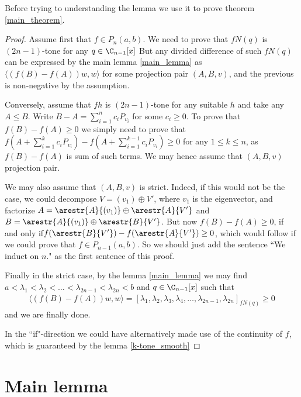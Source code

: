 Before trying to understanding the lemma we use it to prove theorem \ref{main_theorem}.

\begin{proof}
	Assume first that $f \in P_{n}(a, b)$. We need to prove that $f N(q)$ is $(2 n - 1)$-tone for any $q \in \C_{n - 1}[x]$ But any divided difference of such $f N(q)$ can be expressed by the main lemma \ref{main_lemma} as $\langle (f(B) - f(A)) w, w \rangle$ for some projection pair $(A, B, v)$, and the previous is non-negative by the assumption.

	Conversely, assume that $f h$ is $(2 n - 1)$-tone for any suitable $h$ and take any $A \leq B$. Write $B - A = \sum_{i = 1}^{n} c_{i} P_{v_{i}}$ for some $c_{i} \geq 0$. To prove that $f(B) - f(A) \geq 0$ we simply need to prove that $f(A + \sum_{i = 1}^{k} c_{i} P_{v_{i}}) - f(A + \sum_{i = 1}^{k - 1} c_{i} P_{v_{i}}) \geq 0$ for any $1 \leq k \leq n$, as $f(B) - f(A)$ is sum of such terms. We may hence assume that $(A, B, v)$ projection pair.

	We may also assume that $(A, B, v)$ is strict. Indeed, if this would not be the case, we could decompose $V = (v_{1}) \oplus V'$, where $v_{1}$ is the eigenvector, and factorize $A = \arestr{A}{(v_{1})} \oplus \arestr{A}{V'}$ and $B = \arestr{A}{(v_{1})} \oplus \arestr{B}{V'}$. But now $f(B) - f(A) \geq 0$, if and only if$f(\arestr{B}{V'}) - f(\arestr{A}{V'}) \geq 0$, which would follow if we could prove that $f \in P_{n - 1}(a, b)$. So we should just add the sentence ``We induct on $n$." as the first sentence of this proof.

	Finally in the strict case, by the lemma \ref{main_lemma} we may find $a < \lambda_{1} < \lambda_{2} < \ldots < \lambda_{2 n - 1} < \lambda_{2 n} < b$ and $q \in \C_{n - 1}[x]$ such that
	\begin{align*}
		\langle (f(B) - f(A)) w, w \rangle = [\lambda_{1}, \lambda_{2}, \lambda_{3}, \lambda_{4}, \ldots, \lambda_{2n - 1}, \lambda_{2 n}]_{f N(q)} \geq 0
	\end{align*}
	and we are finally done.

	In the ``if"-direction we could have alternatively made use of the continuity of $f$, which is guaranteed by the lemma \ref{k-tone_smooth}

\end{proof}

\section{Main lemma}

